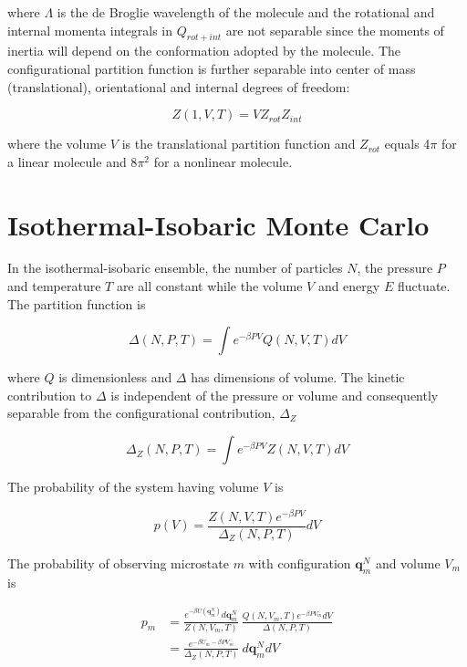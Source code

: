 where $\Lambda$ is the de Broglie wavelength of the molecule and the rotational and internal momenta integrals in $Q_{rot+int}$ are not separable since the moments of inertia will depend on the conformation adopted by the molecule. The configurational partition function is further separable into center of mass (translational), orientational and internal degrees of freedom:

\begin{equation}
\label{eq:configPartitionFn_1VT}
Z(1,V,T) = VZ_{rot}Z_{int}
\end{equation}

where the volume $V$ is the translational partition function and $Z_{rot}$ equals 4$\pi$ for a linear molecule and 8$\pi^2$ for a nonlinear molecule.

\section{Isothermal-Isobaric Monte Carlo}
\label{sec:NPT}
In the isothermal-isobaric ensemble, the number of particles $N$, the pressure $P$ and temperature $T$ are all constant while the volume $V$ and energy $E$ fluctuate. The partition function is

\begin{equation}
\label{eq:partitionFn_NPT}
\Delta(N,P,T) = \int e^{-\beta P V} Q(N,V,T) dV
\end{equation}

where $Q$ is dimensionless and $\Delta$ has dimensions of volume. 
The kinetic contribution to $\Delta$ is independent of the pressure or volume and
consequently separable from the configurational contribution, $\Delta_Z$

\begin{equation}
\label{eq:configPartitionFn_NPT}
\Delta_Z(N,P,T) = \int e^{-\beta P V} Z(N,V,T) dV
\end{equation}

The probability of the system having volume $V$ is 

\begin{equation}
\label{eq:pV}
p(V) = \frac{Z(N,V,T)e^{-\beta P V}}{\Delta_Z(N,P,T)}dV
\end{equation}

The probability of observing microstate $m$ with configuration $\mathbf{q}_m^N$ and volume $V_m$ is

\begin{align}
\label{eq:pNPT}
p_m &= \frac{e^{-\beta U(\mathbf{q}_m^N)}d\mathbf{q}_m^N}{Z(N,V_m,T)}\ \frac{Q(N,V_m,T) e^{-\beta P V_m} dV}{\Delta(N,P,T)} \nonumber \\
&= \frac{e^{-\beta U_m - \beta P V_m}}{\Delta_Z(N,P,T)}\ d\mathbf{q}_m^N dV
\end{align}

